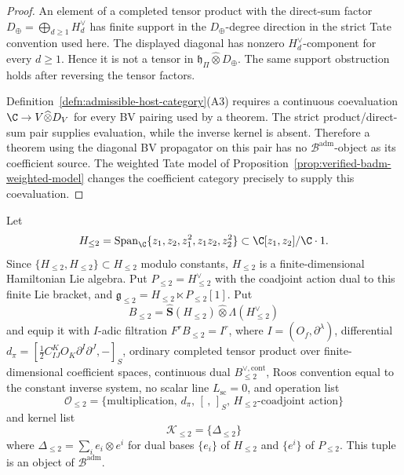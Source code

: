 \begin{proof}
  An element of a completed tensor product with the direct-sum factor
  \(D_\oplus=\bigoplus_{d\ge1}H_d^\vee\) has finite support in the
  \(D_\oplus\)-degree direction in the strict Tate convention used
  here.  The displayed diagonal has nonzero \(H_d^\vee\)-component for
  every \(d\ge1\).  Hence it is not a tensor in
  \(\mathfrak h_\Pi\widehat\otimes D_\oplus\).  The same support
  obstruction holds after reversing the tensor factors.

  Definition~\ref{defn:admissible-host-category}(A3) requires a
  continuous coevaluation \(\C\to V\widehat\otimes D_V\) for every BV
  pairing used by a theorem.  The strict product/direct-sum pair
  supplies evaluation, while the inverse kernel is absent.  Therefore a
  theorem using the diagonal BV propagator on this pair has no
  \(\mathcal B^{\mathrm{adm}}\)-object as its coefficient source.  The
  weighted Tate model of
  Proposition~\ref{prop:verified-badm-weighted-model} changes the
  coefficient category precisely to supply this coevaluation.
\end{proof}

\begin{prop}
\label{prop:verified-badm-finite-model}
  Let
  \[
    H_{\leq 2}
    =
    \operatorname{Span}_{\C}\{z_1,z_2,z_1^2,z_1z_2,z_2^2\}
    \subset \C[z_1,z_2]/\C\cdot1 .
  \]
  Since \(\{H_{\leq2},H_{\leq2}\}\subset H_{\leq2}\) modulo constants,
  \(H_{\leq2}\) is a finite-dimensional Hamiltonian Lie algebra.  Put
  \(P_{\leq2}=H_{\leq2}^{\vee}\) with the coadjoint action dual to this
  finite Lie bracket, and
  \(\mathfrak g_{\leq2}=H_{\leq2}\ltimes P_{\leq2}[1]\).  Put
  \[
    B_{\leq2}
    =
    \widehat{\mathbf S}(H_{\leq2})
    \widehat\otimes
    \Lambda(H_{\leq2}^{\vee})
  \]
  and equip it with \(I\)-adic filtration \(F^rB_{\leq2}=I^r\), where
  \(I=(O_f,\partial^\lambda)\), differential
  \(d_\pi=[\frac12C^K_{IJ}O_K\partial^I\partial^J,-]_S\), ordinary completed
  tensor product over finite-dimensional coefficient spaces, continuous
  dual \(B_{\leq2}^{\vee,\mathrm{cont}}\), Roos convention equal to the
  constant inverse system, no scalar line \(L_{\mathrm{sc}}=0\), and
  operation list
  \[
    \mathcal O_{\leq2}
    =
    \{\text{multiplication},\,d_\pi,\,[\, ,\,]_S,\,
      H_{\leq2}\text{-coadjoint action}\}
  \]
  and kernel list
  \[
    \mathcal K_{\leq2}=\{\Delta_{\leq2}\}
  \]
  where \(\Delta_{\leq2}=\sum_i e_i\otimes e^i\) for dual bases
  \(\{e_i\}\) of \(H_{\leq2}\) and \(\{e^i\}\) of \(P_{\leq2}\).  This
  tuple is an object of \(\mathcal B^{\mathrm{adm}}\).
\end{prop}

